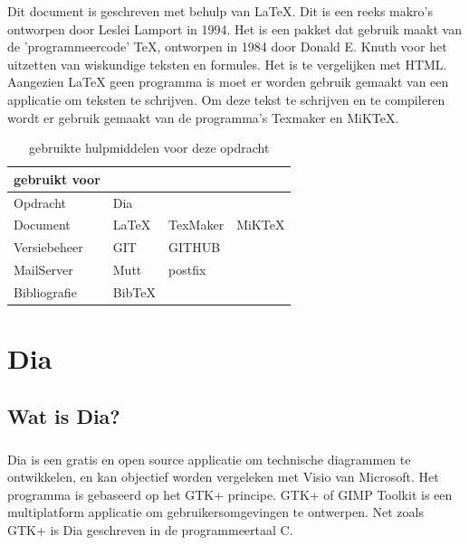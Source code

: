\documentclass[12pt,a4paper]{report}
\begin{document}
\begin{flushleft}
Dit document is geschreven met behulp van \LaTeX{}. Dit is een reeks makro's ontworpen door Leslei Lamport in 1994. Het is een pakket dat gebruik maakt van de 'programmeercode' \TeX{}, ontworpen in 1984 door Donald E. Knuth voor het uitzetten van wiskundige teksten en formules. Het is te vergelijken met HTML. Aangezien \LaTeX{} geen programma is moet er worden gebruik gemaakt van een applicatie om teksten te schrijven. Om deze tekst te schrijven en te compileren wordt er gebruik gemaakt van de programma's Texmaker en MiKTeX.

\begin{table}[H]
\begin{tabular}{|l || l  l  l|}
\hline
gebruikt voor &&& \\
\hline
Opdracht & Dia & & \\
Document & LaTeX & TexMaker & MiKTeX\\
Versiebeheer & GIT & GITHUB & \\
MailServer & Mutt & postfix & \\
Bibliografie & BibTeX & &  \\
\hline
\end{tabular}
\centering
\caption{gebruikte hulpmiddelen voor deze opdracht}
\end{table}

\tableofcontents

\chapter{Dia}
\section{Wat is Dia?}
\paragraph*{}
Dia is een gratis en open source applicatie om technische diagrammen te ontwikkelen, en kan objectief worden vergeleken met Visio van Microsoft. Het programma is gebaseerd op het GTK+ principe. GTK+ of GIMP Toolkit is een multiplatform applicatie om gebruikersomgevingen te ontwerpen. Net zoals GTK+ is Dia geschreven in de programmeertaal C. 

\end{flushleft}
\end{document}
